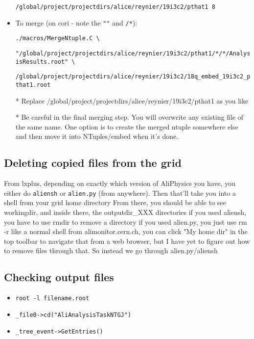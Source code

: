 \documentclass[12pt]{article}
\begin{document}
\begin{itemize}
\verb|/global/project/projectdirs/alice/reynier/19i3c2/pthat1 8|

\item To merge (on cori - note the \verb|""| and \verb|/*|):

\verb|./macros/MergeNtuple.C \|

\verb|"/global/project/projectdirs/alice/reynier/19i3c2/pthat1/*/*/AnalysisResults.root" \|

\verb|/global/project/projectdirs/alice/reynier/19i3c2/18q_embed_19i3c2_pthat1.root|

* Replace /global/project/projectdirs/alice/reynier/19i3c2/pthat1 as you like

* Be careful in the final merging step. You will overwrite any existing file of the same name. One option is to create the merged ntuple somewhere else and then move it into NTuples/embed when it's done.
\end{itemize}

\subsection{Deleting copied files from the grid}

From lxplus, depending on exactly which version of AliPhysics you have, you either do \verb|aliensh| or \verb|alien.py| (from anywhere).
Then that'll take you into a shell from your grid home directory
From there, you should be able to see workingdir, and inside there, the outputdir\_XXX directories
if you used aliensh, you have to use rmdir to remove a directory
if you used alien.py, you just use rm -r like a normal shell
from alimonitor.cern.ch, you can click "My home dir" in the top toolbar to navigate that from a web browser, but I have yet to figure out how to remove files through that. So instead we go through alien.py/aliensh

\subsection{Checking output files}

\begin{itemize}
\item \verb|root -l filename.root|
\item \verb|_file0->cd("AliAnalysisTaskNTGJ")|
\item \verb|_tree_event->GetEntries()|
\end{itemize}
\end{document}
